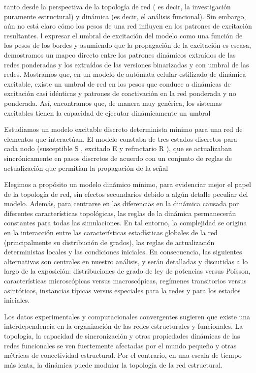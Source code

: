 tanto desde la perspectiva de la topología de red ( es decir, la investigación puramente estructural) y dinámica (es decir, el análisis funcional). Sin embargo, aún no está claro cómo los pesos de una red influyen en los patrones de excitación resultantes. l expresar el umbral de excitación del modelo como una función de los pesos de los bordes y asumiendo que la propagación de la excitación es escasa, demostramos un mapeo directo entre los patrones dinámicos extraídos de las redes ponderadas y los extraídos de las versiones binarizadas y con umbral de las redes. Mostramos que, en un modelo de autómata celular estilizado de dinámica excitable, existe un umbral de red en los pesos que conduce a dinámicas de excitación casi idénticas y patrones de coactivación en la red ponderada y no ponderada. Así, encontramos que, de manera muy genérica, los sistemas excitables tienen la capacidad de ejecutar dinámicamente un umbral

Estudiamos un modelo excitable discreto determinista mínimo para una red de elementos que interactúan. El modelo constaba de tres estados discretos para cada nodo (susceptible S , excitado E y refractario R ), que se actualizaban sincrónicamente en pasos discretos de acuerdo con un conjunto de reglas de actualización que permitían la propagación de la señal



Elegimos a propósito un modelo dinámico mínimo, para evidenciar mejor el papel de la topología de red, sin efectos secundarios debido a algún detalle peculiar del modelo. Además, para centrarse en las diferencias en la dinámica causada por diferentes características topológicas, las reglas de la dinámica permanecerán constantes para todas las simulaciones. En tal entorno, la complejidad se origina en la interacción entre las características estadísticas globales de la red (principalmente su distribución de grados), las reglas de actualización deterministas locales y las condiciones iniciales. En consecuencia, las siguientes alternativas son centrales en nuestro análisis, y serán detalladas y discutidas a lo largo de la exposición: distribuciones de grado de ley de potencias versus Poisson, características microscópicas versus macroscópicas, regímenes transitorios versus asintóticos, instancias típicas versus especiales para la redes y para los estados iniciales.

Los datos experimentales y computacionales convergentes sugieren que existe una interdependencia en la organización de las redes estructurales y funcionales. La topología, la capacidad de sincronización y otras propiedades dinámicas de las redes funcionales se ven fuertemente afectadas por el mundo pequeño y otras métricas de conectividad estructural. Por el contrario, en una escala de tiempo más lenta, la dinámica puede modular la topología de la red estructural.



